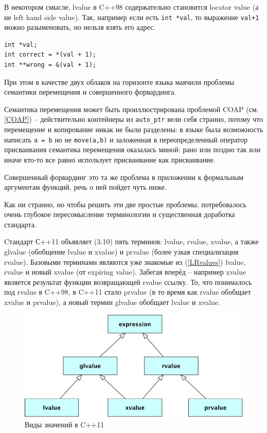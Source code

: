 \documentclass[a4paper,12pt,oneside]{article}
\begin{document}
В некотором смысле, lvalue в C++98 содержательно становится locator value (а не left hand side value). Так, например если есть \lstinline!int *val!, то выражение \lstinline!val+1! можно разыменовать, но нельзя взять его адрес.

\begin{lstlisting}
int *val;
int correct = *(val + 1);
int **wrong = &(val + 1);
\end{lstlisting}

При этом в качестве двух облаков на горизонте языка маячили проблемы семантики перемещения и совершенного форвардинга.

Семантика перемещения может быть проиллюстрирована проблемой COAP (см. \ref{COAP}) -- действительно контейнеры из \lstinline!auto_ptr! вели себя странно, потому что перемещение и копирование никак не были разделены: в языке была возможность написать \lstinline!a = b! но не \lstinline!move(a,b)! и заложенная в переопределенный оператор присваивания семантика перемещения оказалась миной: рано или поздно так или иначе кто-то все равно использует присваивание как присваивание.

Совершенный форвардинг это та же проблема в приложении к формальным аргументам функций, речь о ней пойдет чуть ниже.

Как ни странно, но чтобы решить эти две простые проблемы, потребовалось очень глубокое пересомысление терминологии и существенная доработка стандарта.

Cтандарт С++11 объявляет (3.10) пять терминов: lvalue, rvalue, xvalue, а также glvalue (обобщение lvalue и xvalue) и prvalue (более узкая специализация rvalue). Базовыми терминами являются уже знакомые из (\ref{LRvalues}) lvalue, rvalue и новый xvalue (от expiring value). Забегая вперёд -- например xvalue является результат функции возвращающей rvalue ссылку. То, что понималось под rvalue в C++98, в C++11 стало prvalue (в то время как rvalue обобщает xvalue и prvalue), а новый термин glvalue обобщает lvalue и xvalue. 

\begin{figure}[h!]
\centering
\includegraphics[width=1.0\textwidth]{illustrations/value-cat-crop.pdf}
\caption{Виды значений в C++11}
\label{fig:val_category}
\end{figure}
\end{document}
